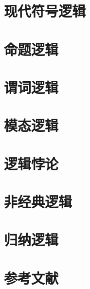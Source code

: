\documentclass[a4paper,11pt,twoside]{book}
\begin{document}
\chapter{现代符号逻辑}
 
 







\chapter{命题逻辑}





\chapter{谓词逻辑}







\chapter{模态逻辑}




\chapter{逻辑悖论}




\chapter{非经典逻辑}








\chapter{归纳逻辑}








\backmatter
\chapter*{参考文献}
\end{document}
